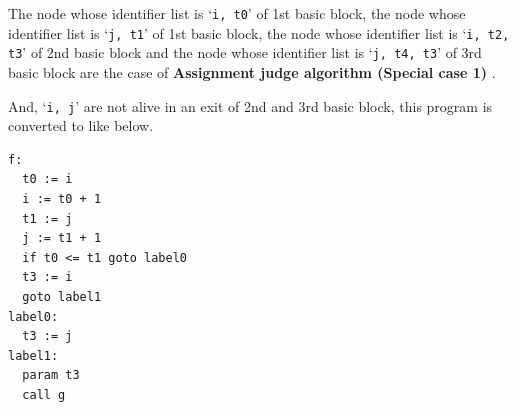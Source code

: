 \begin{Example}
The node whose identifier list is `{\tt{i, t0}}' of 1st basic block,
the node whose identifier list is `{\tt{j, t1}}' of 1st basic block,
the node whose identifier list is `{\tt{i, t2, t3}}' of 2nd basic block
and the node whose identifier list is `{\tt{j, t4, t3}}' of 3rd basic block
are the case of {\bf Assignment judge algorithm (Special case 1) }.

And, `{\tt{i, j}}' are not alive in an exit of 2nd and 3rd basic block,
this program is converted to like below.
\begin{verbatim}
f:
  t0 := i
  i := t0 + 1
  t1 := j
  j := t1 + 1
  if t0 <= t1 goto label0
  t3 := i
  goto label1
label0:
  t3 := j
label1:
  param t3
  call g
\end{verbatim}
\end{Example}

\begin{Example}
\label{optimize_e103}
\begin{verbatim}


\end{verbatim}
\end{Example}
